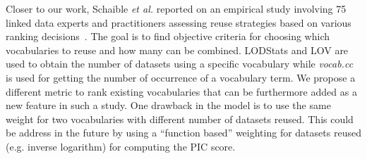 Closer to our work, Schaible \emph{et al.} reported on an empirical study involving 75 linked data experts and practitioners assessing reuse strategies based on various ranking decisions~\cite{Schaible:ESWC14}. The goal is to find objective criteria for choosing which vocabularies to reuse and how many can be combined. LODStats and LOV are used to obtain the number of datasets using a specific vocabulary while \textit{vocab.cc} is used for getting the number of occurrence of a vocabulary term. We propose a different metric to rank existing vocabularies that can be furthermore added as a new feature in such a study. One drawback in the model is to use the same weight for two vocabularies with different number of datasets reused. This could be address in the future by using a ``function based'' weighting for datasets reused (e.g. inverse logarithm) for computing the PIC score.



